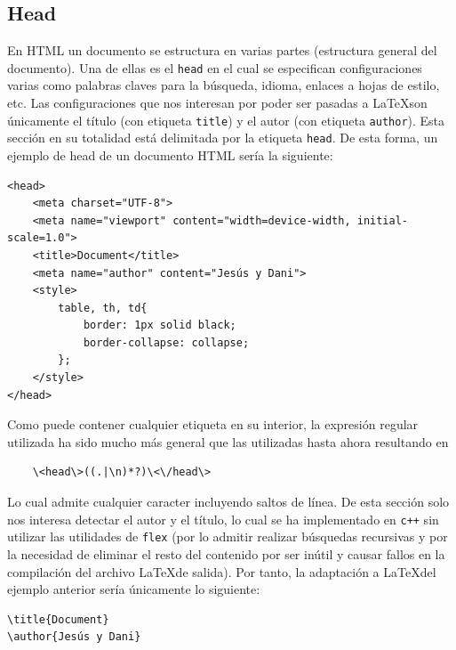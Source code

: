 \documentclass[12pt]{article}
\begin{document}
\subsection{Head}
En HTML un documento se estructura en varias partes (estructura general del documento). Una de ellas es el \verb|head| en el cual se especifican configuraciones varias como palabras claves para la búsqueda, idioma, enlaces a hojas de estilo, etc. Las configuraciones que nos interesan por poder ser pasadas a \LaTeX son únicamente el título (con etiqueta \verb|title|) y el autor (con etiqueta \verb|author|). Esta sección en su totalidad está delimitada por la etiqueta \verb|head|. De esta forma, un ejemplo de head de un documento HTML sería la siguiente:
\begin{verbatim}
<head>
    <meta charset="UTF-8">
    <meta name="viewport" content="width=device-width, initial-scale=1.0">
    <title>Document</title>
    <meta name="author" content="Jesús y Dani">
    <style>
        table, th, td{
            border: 1px solid black;
            border-collapse: collapse;
        };
    </style>
</head>
\end{verbatim}
Como puede contener cualquier etiqueta en su interior, la expresión regular utilizada ha sido mucho más general que las utilizadas hasta ahora resultando en 
\begin{verbatim}
    \<head\>((.|\n)*?)\<\/head\>
\end{verbatim}
Lo cual admite cualquier caracter incluyendo saltos de línea. De esta sección solo nos interesa detectar el autor y el título, lo cual se ha implementado en \verb|c++| sin utilizar las utilidades de \verb|flex| (por lo admitir realizar búsquedas recursivas y por la necesidad de eliminar el resto del contenido por ser inútil y causar fallos en la compilación del archivo \LaTeX de salida). Por tanto, la adaptación a \LaTeX del ejemplo anterior sería únicamente lo siguiente:
\begin{verbatim}
\title{Document}
\author{Jesús y Dani}
\end{verbatim}
\end{document}
